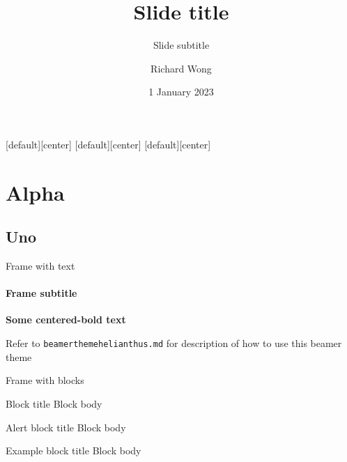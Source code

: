 \documentclass[aspectratio=169]{beamer}
\title{Slide title}
\subtitle{Slide subtitle}
\author{Richard Wong}
\institute[rtk]{Institute of Richard Wong}
\date{1 January 2023}
\begin{document}
  \settitlepagestyle
  
  \maketitle
  
  [default][center]
  [default][center]
  [default][center]
  
	\maketitle

  \section{Alpha}
  
  \setsectionpagestyle
  
  \frame{\sectionpage}
  
  \subsection{Uno}
  
  \frame{\subsectionpage}
  
  \setcontentstyle
  
  \begin{frame}{Frame with text}
  	\framesubtitle{Frame subtitle}
    \centering
    \textbf{Some centered-bold text}
    
    \vspace{5mm}
    
    Refer to \texttt{beamerthemehelianthus.md} for description of how to use this beamer theme
  \end{frame}
  
  \begin{frame}{Frame with blocks}
  	\begin{block}{Block title}
  		Block body
  	\end{block}
  	
  	\begin{alertblock}{Alert block title}
  		Block body
  	\end{alertblock}
  	
  	\begin{exampleblock}{Example block title}
  		Block body
  	\end{exampleblock}
  \end{frame}
\end{document}
